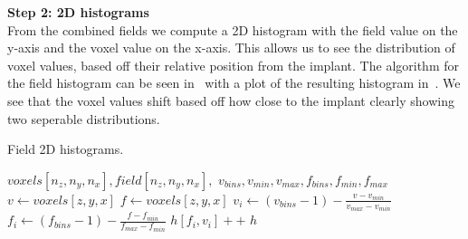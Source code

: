 \vspace{\baselineskip}
\noindent\textbf{Step 2: 2D histograms} \\

From the combined fields we compute a 2D histogram with the field value on the y-axis and the voxel value on the x-axis. 
This allows us to see the distribution of voxel values, based off their relative position from the implant.
The algorithm for the field histogram can be seen in~ with a plot of the resulting histogram in~.
We see that the voxel values shift based off how close to the implant clearly showing two seperable distributions.

\begin{algorithm}
    \caption{Field 2D histograms.}
    \label{alg:field-hist}
    \begin{algorithmic}
         {$voxels[n_z,n_y,n_x], field[n_z,n_y,n_x],$ \newline $v_{bins}, v_{min}, v_{max}, f_{bins}, f_{min}, f_{max}$}
                \State $v \gets voxels[z,y,x]$
                    \State $f \gets voxels[z,y,x]$
                        \State $v_i \gets (v_{bins} - 1) - \frac{v - v_{min}}{v_{max} - v_{min}}$
                        \State $f_i \gets (f_{bins} - 1) - \frac{f - f_{min}}{f_{max} - f_{min}}$
                        \State $h[f_i,v_i]{+}{+}$
                    \EndIf
                \EndIf
            \EndFor
            \Return $h$
        \EndFunction
    \end{algorithmic}
\end{algorithm}

